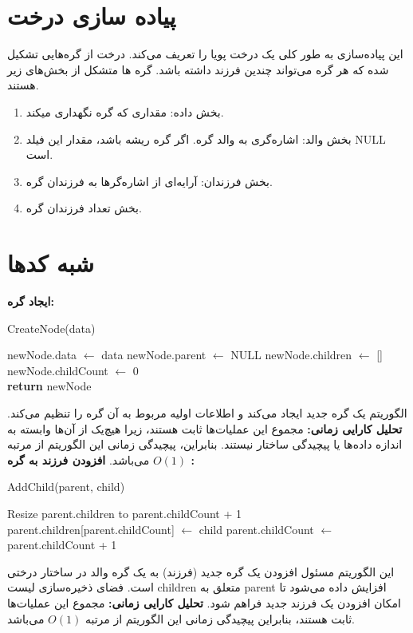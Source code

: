\documentclass{article}
\begin{document}
\vspace{0.5cm}
\newpage

\section*{پیاده سازی درخت}
این پیاده‌سازی به طور کلی یک درخت پویا را تعریف می‌کند. درخت از گره‌هایی تشکیل شده که هر گره می‌تواند چندین فرزند داشته باشد. گره ها متشکل از بخش‌های زیر هستند.
\begin{enumerate}
	\item
بخش داده: مقداری که گره نگهداری میکند.
	\item
بخش والد: اشاره‌گری به والد گره. اگر گره ریشه باشد، مقدار این فیلد NULL است.
	\item
بخش فرزندان: آرایه‌ای از اشاره‌گرها به فرزندان گره.
	\item
بخش تعداد فرزندان گره.
\end{enumerate}


\section*{شبه کدها}

\textbf{ایجاد گره:}
\begin{latin}
	\begin{algorithm}
		\caption{CreateNode(data)}
		\begin{algorithmic}[1]
			\State newNode.data $\gets$ data
			\State newNode.parent $\gets$ NULL
			\State newNode.children $\gets$ []
			\State newNode.childCount $\gets$ 0 \\
			\State\textbf{return} newNode
		\end{algorithmic}
	\end{algorithm}
\end{latin}
الگوریتم یک گره جدید ایجاد می‌کند و اطلاعات اولیه مربوط به آن گره را تنظیم می‌کند.
\newline
\textbf{تحلیل کارایی زمانی:}
مجموع این عملیات‌ها ثابت هستند، زیرا هیچ‌یک از آن‌ها وابسته به اندازه داده‌ها یا پیچیدگی ساختار نیستند. بنابراین، پیچیدگی زمانی این الگوریتم از مرتبه $O(1)$ می‌باشد.
\bigbreak\bigbreak\bigbreak
\textbf{افزودن فرزند به گره :}
\begin{latin}
	\begin{algorithm}
		\caption{AddChild(parent, child)}
		\begin{algorithmic}[1]
			\State Resize parent.children to parent.childCount + 1
			\State parent.children[parent.childCount] $\gets$ child
			\State parent.childCount $\gets$ parent.childCount + 1
		\end{algorithmic}
	\end{algorithm}
\end{latin}
این الگوریتم مسئول افزودن یک گره جدید (فرزند) به یک گره والد در ساختار درختی است. فضای ذخیره‌سازی لیست children متعلق به parent افزایش داده می‌شود تا امکان افزودن یک فرزند جدید فراهم شود.
\newline
\textbf{تحلیل کارایی زمانی:}
مجموع این عملیات‌ها ثابت هستند، بنابراین پیچیدگی زمانی این الگوریتم از مرتبه $O(1)$ می‌باشد.
\end{document}
